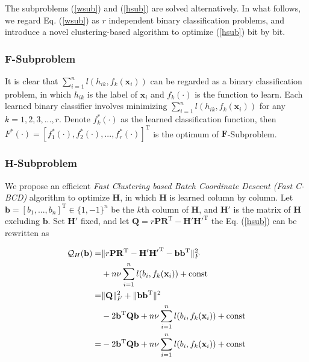 \documentclass[conference]{IEEEtran}
\begin{document}
The subproblems (\ref{wsub}) and (\ref{hsub}) are solved alternatively. In what follows, we regard Eq. (\ref{wsub}) as $r$ independent binary classification problems, and introduce a novel clustering-based algorithm to optimize (\ref{hsub}) bit by bit.

\subsubsection{$\mathbf{F}$-Subproblem}

It is clear that $\sum_{i=1}^n l (h_{ik}, f_k(\mathbf{x}_i))$ can be regarded as a binary classification problem, in which $h_{ik}$ is the label of $\mathbf{x}_i$ and $f_k(\cdot)$ is the function to learn. Each learned binary classifier involves minimizing $\sum_{i=1}^n l (h_{ik}, f_k(\mathbf{x}_i))$ for any$ k=1,2,3,...,r$. Denote $f^*_k(\cdot)$ as the learned classification function, then $F^*(\cdot)=[f^*_1(\cdot),f^*_2(\cdot),...,f^*_r(\cdot)]^\mathrm{T}$ is the optimum of $\mathbf{F}$-Subproblem.

\subsubsection{$\mathbf{H}$-Subproblem}

We propose an efficient {\em Fast Clustering based Batch Coordinate Descent (Fast C-BCD)} algorithm to optimize $\mathbf{H}$, in which $\mathbf{H}$ is learned column by column. Let $\mathbf{b}=[b_1,...,b_n]^\mathrm{T} \in \{1,-1\}^{n}$ be the $k$th column of $\mathbf{H}$, and $\mathbf{H}'$ is the matrix of $\mathbf{H}$ excluding $\mathbf{b}$. Set $\mathbf{H}'$ fixed, and let $\mathbf{Q}=r\mathbf{P}\mathbf{R}^\mathrm{T} - \mathbf{H}{'} \mathbf{H}{'} ^{\mathrm{T}}$ the Eq. (\ref{hsub}) can be rewritten as

\begin{equation}
\begin{split}
\mathcal{Q}_H(\mathbf{b}) =& \Arrowvert r\mathbf{P}\mathbf{R}^\mathrm{T} - \mathbf{H}{'} \mathbf{H}{'} ^{\mathrm{T}} - \mathbf{b}\mathbf{b}^{\mathrm{T}} \Arrowvert_F^2 \\
&+ n \nu \sum_{i=1}^n l (b_{i}, f_k(\mathbf{x}_i)) + \mathrm{const} \\
=&\Arrowvert \mathbf{Q} \Arrowvert_F^2 + \Arrowvert \mathbf{b}\mathbf{b}^\mathrm{T} \Arrowvert^2 \\
&- 2\mathbf{b}^\mathrm{T} \mathbf{Q} \mathbf{b} + n \nu \sum_{i=1}^n l (b_{i}, f_k(\mathbf{x}_i)) + \mathrm{const} \\
=& - 2\mathbf{b}^\mathrm{T} \mathbf{Q} \mathbf{b} + n \nu \sum_{i=1}^n l (b_{i}, f_k(\mathbf{x}_i)) + \mathrm{const}
\end{split}
\end{equation}
\end{document}
